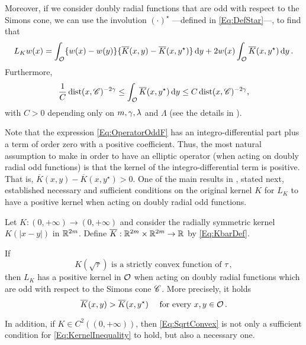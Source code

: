 Moreover, if we consider doubly radial functions that are odd with respect to the Simons cone, we can use the involution $(\cdot)^\star$ ---defined in \eqref{Eq:DefStar}---, to find that
\begin{equation}
\label{Eq:OperatorOddF}
L_K w (x) = \int_{\mathcal{O}} \{w(x) - w(y) \} \{\overline{K}(x, y) - \overline{K}(x, y^\star)  \} \,\mathrm{d} y +  2 w(x) \int_{\mathcal{O}} \overline{K}(x, y^\star) \,\mathrm{d} y \,.
\end{equation}
Furthermore,
\begin{equation}
\label{Eq:ZeroOrderTerm}
\frac{1}{C} \operatorname{dist}(x,\mathscr{C})^{-2\gamma} \leq \int_{\mathcal{O}} \overline{K}(x, y^\star) \,\mathrm{d} y \leq C \operatorname{dist}(x,\mathscr{C})^{-2\gamma},
\end{equation}
with $C>0$ depending only on $m, \gamma, \lambda$ and $\Lambda$ (see the details in \cite{FelipeSanz-Perela:IntegroDifferentialI}).


Note that the expression \eqref{Eq:OperatorOddF} has an integro-differential part plus a term of order zero with a positive coefficient. Thus, the most natural assumption to make in order to have an elliptic operator (when acting on doubly radial odd functions) is that the kernel of the integro-differential term is positive. That is, $\overline{K}(x, y) - \overline{K}(x, y^\star)>0$. One of the main results in \cite{FelipeSanz-Perela:IntegroDifferentialI}, stated next, established necessary and sufficient conditions on the original kernel $K$ for $L_K$ to have a positive kernel when acting on doubly radial odd functions. 

\begin{theorem}
	\label{Th:SufficientNecessaryConditions}
	Let $K:(0,+\infty) \to (0,+\infty)$ and consider the radially symmetric kernel $K(|x-y|)$ in $\mathbb{R}^{2m}$. Define $\overline{K} : \mathbb{R}^{2m}\times \mathbb{R}^{2m} \to \mathbb{R}$ by \eqref{Eq:KbarDef}.
	
	If 
	\begin{equation}
	\label{Eq:SqrtConvex}	
	K(\sqrt{\tau}) \text{ is a strictly convex function of }\tau\,,
	\end{equation}
	then $L_K$ has a positive kernel in $\mathcal{O}$ when acting on doubly radial functions which are odd with respect to the Simons cone $\mathscr{C}$. More precisely, it holds
	\begin{equation}
	\label{Eq:KernelInequality}
	\overline{K}(x,y) > \overline{K}(x, y^\star) \quad \text{ for every }x,y \in \mathcal{O}\,.
	\end{equation}
	
	In addition, if $K\in C^2((0,+\infty))$, then \eqref{Eq:SqrtConvex} is not only a sufficient condition for \eqref{Eq:KernelInequality} to hold, but also a necessary one.
\end{theorem}

